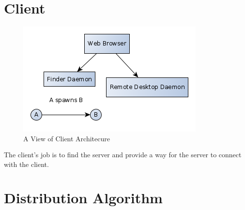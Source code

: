 \section{Client}
\begin{figure}[hb]
\centering
\includegraphics[scale=0.5]{images/client-arcitechure.png}
\caption{A View of Client Architecure}
\end{figure}

The client's job is to find the server and provide a way for the server to connect with the client.

\section{Distribution Algorithm}